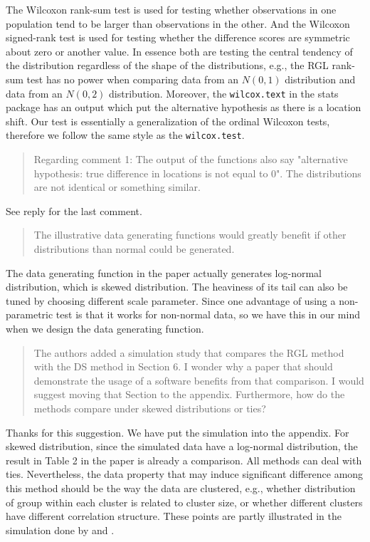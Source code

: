 \documentclass[12pt]{article}
\newcommand{\pkg}[1]{{\fontseries{b}\selectfont #1}}
\newenvironment{comment}%
{\begin{quotation}\noindent\small\it\ignorespaces%
  }{\end{quotation}}
\begin{document}
The Wilcoxon rank-sum test is used for testing whether observations in one
population tend to be larger than observations in the other. And the
Wilcoxon signed-rank test is used for testing whether the difference scores
are symmetric about zero or another value. In essence both are testing the
central tendency of the distribution regardless of the shape of the
distributions, e.g., the RGL rank-sum test has no power when comparing data
from an $N(0, 1)$ distribution and data from an $N(0, 2)$
distribution. Moreover, the \texttt{wilcox.text} in the \pkg{stats} package
has an output which put the alternative hypothesis as there is a location
shift. Our test is essentially a generalization of the ordinal Wilcoxon
tests, therefore we follow the same style as the \texttt{wilcox.test}.

\begin{comment}
Regarding comment 1: The output of the functions also say "alternative
hypothesis: true difference in locations is not equal to 0". The distributions are
not identical or something similar.
\end{comment}

See reply for the last comment.

\begin{comment}
The illustrative data generating functions would greatly benefit if other
distributions than normal could be generated.
\end{comment}

The data generating function in the paper actually generates log-normal
distribution, which is skewed distribution. The heaviness of its tail can
also be tuned by choosing different scale parameter. Since one advantage of
using a non-parametric test is that it works for non-normal data, so we have
this in our mind when we design the data generating function.

\begin{comment}
The authors added a simulation study that compares the RGL method with the
DS method in Section 6. I wonder why a paper that should demonstrate the
usage of a software benefits from that comparison. I would suggest moving
that Section to the appendix. Furthermore, how do the methods compare
under skewed distributions or ties?
\end{comment}
Thanks for this suggestion. We have put the simulation into the appendix.
For skewed distribution, since the simulated data have a log-normal
distribution, the result in Table 2 in the paper is already a comparison.
All methods can deal with ties. Nevertheless, the data property that may
induce significant difference among this method should be the way the data
are clustered, e.g., whether distribution of group within each cluster is
related to cluster size, or whether different clusters have different
correlation structure. These points are partly illustrated in the simulation
done by \citet{Datt:Satt:rank:2005} and \citet{Datt:Satt:sign:2008}.
\end{document}
